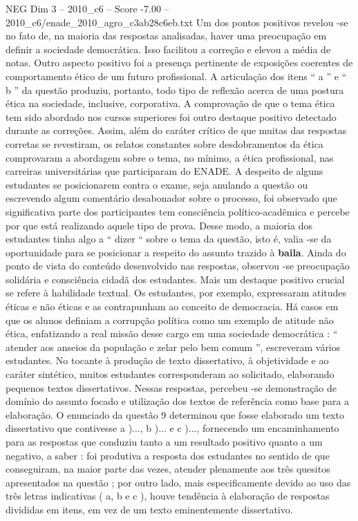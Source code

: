 \begin{textsample}{NEG Dim 3 – 2010\_c6 – Score -7.00 – 2010\_c6/enade\_2010\_agro\_c3ab28c6eb.txt}
Um dos pontos positivos revelou -se no fato de, na maioria das respostas analisadas, haver uma preocupação em definir a sociedade democrática.
Isso facilitou a correção e elevou a média de notas.
Outro aspecto positivo foi a presença pertinente de exposições coerentes de comportamento ético de um futuro profissional.
A articulação dos itens “ a ” e “ b ” da questão produziu, portanto, todo tipo de reflexão acerca de uma postura ética na sociedade, inclusive, corporativa.
A comprovação de que o tema ética tem sido abordado nos cursos superiores foi outro destaque positivo detectado durante as correções.
Assim, além do caráter crítico de que muitas das respostas corretas se revestiram, os relatos constantes sobre desdobramentos da ética comprovaram a abordagem sobre o tema, no mínimo, a ética profissional, nas carreiras universitárias que participaram do ENADE.
A despeito de alguns estudantes se posicionarem contra o exame, seja anulando a questão ou escrevendo algum comentário desabonador sobre o processo, foi observado que significativa parte dos participantes tem consciência político-acadêmica e percebe por que está realizando aquele tipo de prova.
Desse modo, a maioria dos estudantes tinha algo a “ dizer “ sobre o tema da questão, isto é, valia -se da oportunidade para se posicionar a respeito do assunto trazido à \textbf{baila}.
Ainda do ponto de vista do conteúdo desenvolvido nas respostas, observou -se preocupação solidária e consciência cidadã dos estudantes.
Mais um destaque positivo crucial se refere à habilidade textual.
Os estudantes, por exemplo, expressaram atitudes éticas e não éticas e as contrapunham ao conceito de democracia.
Há casos em que os alunos definiam a corrupção política como um exemplo de atitude não ética, enfatizando a real missão desse cargo em uma sociedade democrática : “ atender aos anseios da população e zelar pelo bem comum ”, escreveram vários estudantes.
No tocante à produção de texto dissertativo, à objetividade e ao caráter sintético, muitos estudantes corresponderam ao solicitado, elaborando pequenos textos dissertativos.
Nessas respostas, percebeu -se demonstração de domínio do assunto focado e utilização dos textos de referência como base para a elaboração.
O enunciado da questão 9 determinou que fosse elaborado um texto dissertativo que contivesse a )..., b )... e c )..., fornecendo um encaminhamento para as respostas que conduziu tanto a um resultado positivo quanto a um negativo, a saber : foi produtiva a resposta dos estudantes no sentido de que conseguiram, na maior parte das vezes, atender plenamente aos três quesitos apresentados na questão ; por outro lado, mais especificamente devido ao uso das três letras indicativas ( a, b e c ), houve tendência à elaboração de respostas divididas em itens, em vez de um texto eminentemente dissertativo.

\end{textsample}
